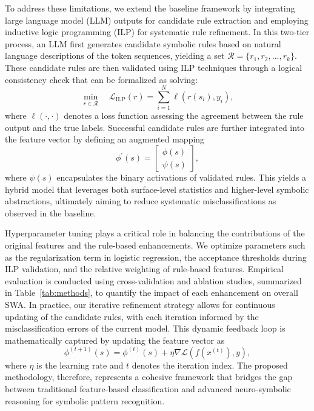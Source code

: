 \documentclass{article}
\begin{document}
To address these limitations, we extend the baseline framework by integrating large language model (LLM) outputs for candidate rule extraction and employing inductive logic programming (ILP) for systematic rule refinement. In this two-tier process, an LLM first generates candidate symbolic rules based on natural language descriptions of the token sequences, yielding a set \( \mathcal{R} = \{r_1, r_2, \ldots, r_k\} \). These candidate rules are then validated using ILP techniques through a logical consistency check that can be formalized as solving:
\[
\min_{r \in \mathcal{R}} \quad \mathcal{L}_{\text{ILP}}(r) = \sum_{i=1}^{N} \ell\left( r(s_i), y_i \right),
\]
where \(\ell(\cdot,\cdot)\) denotes a loss function assessing the agreement between the rule output and the true labels. Successful candidate rules are further integrated into the feature vector by defining an augmented mapping
\[
\phi^{\prime}(s) = \begin{bmatrix} \phi(s) \\ \psi(s) \end{bmatrix},
\]
where \(\psi(s)\) encapsulates the binary activations of validated rules. This yields a hybrid model that leverages both surface-level statistics and higher-level symbolic abstractions, ultimately aiming to reduce systematic misclassifications as observed in the baseline.

Hyperparameter tuning plays a critical role in balancing the contributions of the original features and the rule-based enhancements. We optimize parameters such as the regularization term in logistic regression, the acceptance thresholds during ILP validation, and the relative weighting of rule-based features. Empirical evaluation is conducted using cross-validation and ablation studies, summarized in Table~\ref{tab:methods}, to quantify the impact of each enhancement on overall SWA. In practice, our iterative refinement strategy allows for continuous updating of the candidate rules, with each iteration informed by the misclassification errors of the current model. This dynamic feedback loop is mathematically captured by updating the feature vector as
\[
\phi^{(t+1)}(s) = \phi^{(t)}(s) + \eta \nabla \mathcal{L}(f(x^{(t)}), y),
\]
where \( \eta \) is the learning rate and \( t \) denotes the iteration index. The proposed methodology, therefore, represents a cohesive framework that bridges the gap between traditional feature-based classification and advanced neuro-symbolic reasoning for symbolic pattern recognition.
\end{document}
